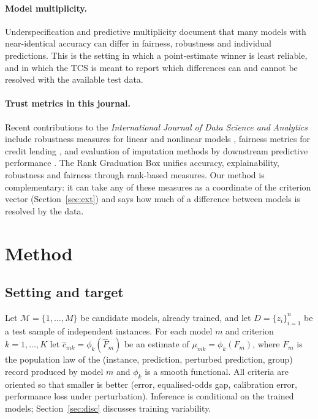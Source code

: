 \documentclass[pdflatex,sn-mathphys-num,iicol]{sn-jnl}
\theoremstyle{thmstyleone}
\theoremstyle{thmstyletwo}
\begin{document}
\paragraph{Model multiplicity.} Underspecification \cite{damour2022} and predictive multiplicity \cite{marx2020} document that many models with near-identical accuracy can differ in fairness, robustness and individual predictions. This is the setting in which a point-estimate winner is least reliable, and in which the TCS is meant to report which differences can and cannot be resolved with the available test data.

\paragraph{Trust metrics in this journal.} Recent contributions to the \emph{International Journal of Data Science and Analytics} include robustness measures for linear and nonlinear models \cite{giudici2024robust}, fairness metrics for credit lending \cite{wu2026safe}, and evaluation of imputation methods by downstream predictive performance \cite{nikitina2026}. The Rank Graduation Box \cite{babaei2025rgb} unifies accuracy, explainability, robustness and fairness through rank-based measures. Our method is complementary: it can take any of these measures as a coordinate of the criterion vector (Section~\ref{sec:ext}) and says how much of a difference between models is resolved by the data.

\section{Method}
\subsection{Setting and target}
Let $\mathcal{M}=\{1,\dots,M\}$ be candidate models, already trained, and let $D=\{z_i\}_{i=1}^n$ be a test sample of independent instances. For each model $m$ and criterion $k=1,\dots,K$ let $\hat c_{mk}=\phi_k(\hat F_m)$ be an estimate of $\mu_{mk}=\phi_k(F_m)$, where $F_m$ is the population law of the (instance, prediction, perturbed prediction, group) record produced by model $m$ and $\phi_k$ is a smooth functional. All criteria are oriented so that smaller is better (error, equalised-odds gap, calibration error, performance loss under perturbation). Inference is conditional on the trained models; Section~\ref{sec:disc} discusses training variability.
\end{document}
